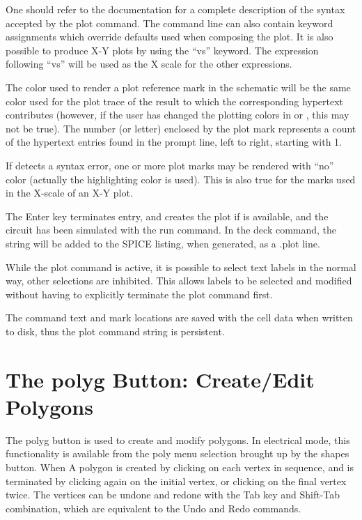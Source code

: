 One should refer to the {\WRspice} documentation for a complete
description of the syntax accepted by the {\cb plot} command.  The
command line can also contain keyword assignments which override
defaults used when composing the plot.  It is also possible to produce
X-Y plots by using the ``{\vt vs}'' keyword.  The expression following
``{\vt vs}'' will be used as the X scale for the other expressions.

The color used to render a plot reference mark in the schematic will
be the same color used for the plot trace of the result to which the
corresponding hypertext contributes (however, if the user has changed
the plotting colors in {\WRspice} or {\Xic}, this may not be true). 
The number (or letter) enclosed by the plot mark represents a count of
the hypertext entries found in the prompt line, left to right,
starting with 1.

If {\Xic} detects a syntax error, one or more plot marks may be
rendered with ``no'' color (actually the highlighting color is used). 
This is also true for the marks used in the X-scale of an X-Y plot.

The {\kb Enter} key terminates entry, and creates the plot if
{\WRspice} is available, and the circuit has been simulated with the
{\cb run} command.  In the {\cb deck} command, the string will be
added to the SPICE listing, when generated, as a {\vt .plot} line.

While the {\cb plot} command is active, it is possible to select text
labels in the normal way, other selections are inhibited.  This
allows labels to be selected and modified without having to
explicitly terminate the {\cb plot} command first.

The command text and mark locations are saved with the cell data when
written to disk, thus the {\cb plot} command string is persistent.


\section{The {\cb polyg} Button: Create/Edit Polygons}

The {\cb polyg} button is used to create and modify polygons.  In
electrical mode, this functionality is available from the {\cb poly}
menu selection brought up by the {\cb shapes} button.  When A polygon
is created by clicking on each vertex in sequence, and is terminated
by clicking again on the initial vertex, or clicking on the final
vertex twice.  The vertices can be undone and redone with the {\kb
Tab} key and {\kb Shift-Tab} combination, which are equivalent to the
{\cb Undo} and {\cb Redo} commands.


